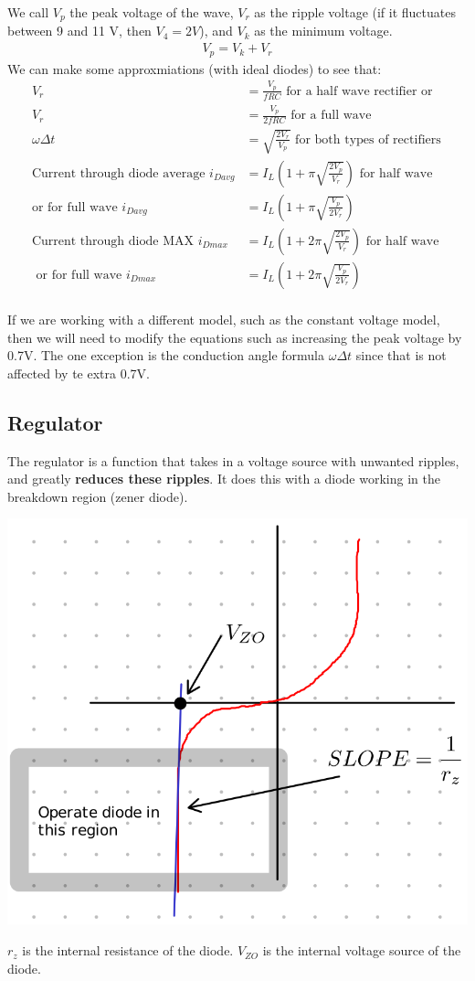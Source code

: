\documentclass[12pt,letterpaper]{article} \usepackage{amsmath} \usepackage{graphicx} \usepackage[margin=1in]{geometry} \usepackage{longtable}  \usepackage{amssymb}
\begin{document}
	We call $V_p$ the peak voltage of the wave, $V_r$ as the ripple voltage (if it fluctuates between 9 and 11 V, then $V_4=2V$), and $V_k$ as the minimum voltage.
	\begin{align*}
		V_p = V_k + V_r
	\end{align*}
	We can make some approxmiations (with ideal diodes) to see that:
	\begin{align*}
		V_r &= \frac{V_p}{fRC} \text{ for a half wave rectifier or } \\
		V_r &= \frac{V_p}{2fRC} \text{ for a full wave }\\
		\omega\Delta t &= \sqrt{\frac{2V_r}{V_p}} \text{ for both types of rectifiers}\\
		\text{Current through diode average }i_{Davg} &= I_L(1+\pi\sqrt{\frac{2V_p}{V_r}}) \text { for half wave} \\ 
		\text{or for full wave } i_{Davg} &= I_L (1+\pi\sqrt{\frac{V_p}{2V_r}}) \\
		\text{Current through diode MAX }i_{Dmax} &= I_L(1+2\pi\sqrt{\frac{2V_p}{V_r}}) \text{ for half wave }\\ 
		\text { or for full wave } i_{Dmax} &= I_L (1+2\pi\sqrt{\frac{V_p}{2V_r}}) \\
	\end{align*}

	If we are working with a different model, such as the constant voltage model, then we will need to modify the equations such as increasing the peak voltage by 0.7V. The one exception is the conduction angle formula $\omega \Delta t$ since that is not affected by te extra 0.7V.
	
	
	\subsection{Regulator}
	The regulator is a function that takes in a voltage source with unwanted ripples, and greatly \textbf{reduces these ripples}. It does this with a diode working in the breakdown region (zener diode).
	\begin{center}
		\includegraphics[width=0.4\linewidth]{regulator}
	\end{center}
	$r_z$ is the internal resistance of the diode. $V_{ZO}$ is the internal voltage source of the diode. 
	
\end{document}

